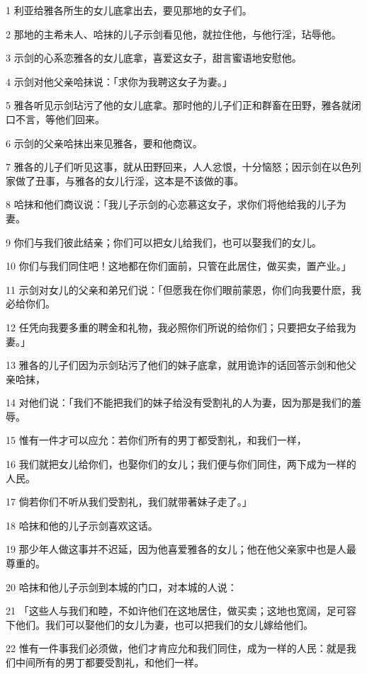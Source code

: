 \par 1 利亚给雅各所生的女儿底拿出去，要见那地的女子们。
\par 2 那地的主希未人、哈抹的儿子示剑看见他，就拉住他，与他行淫，玷辱他。
\par 3 示剑的心系恋雅各的女儿底拿，喜爱这女子，甜言蜜语地安慰他。
\par 4 示剑对他父亲哈抹说：「求你为我聘这女子为妻。」
\par 5 雅各听见示剑玷污了他的女儿底拿。那时他的儿子们正和群畜在田野，雅各就闭口不言，等他们回来。
\par 6 示剑的父亲哈抹出来见雅各，要和他商议。
\par 7 雅各的儿子们听见这事，就从田野回来，人人忿恨，十分恼怒；因示剑在以色列家做了丑事，与雅各的女儿行淫，这本是不该做的事。
\par 8 哈抹和他们商议说：「我儿子示剑的心恋慕这女子，求你们将他给我的儿子为妻。
\par 9 你们与我们彼此结亲；你们可以把女儿给我们，也可以娶我们的女儿。
\par 10 你们与我们同住吧！这地都在你们面前，只管在此居住，做买卖，置产业。」
\par 11 示剑对女儿的父亲和弟兄们说：「但愿我在你们眼前蒙恩，你们向我要什麽，我必给你们。
\par 12 任凭向我要多重的聘金和礼物，我必照你们所说的给你们；只要把女子给我为妻。」
\par 13 雅各的儿子们因为示剑玷污了他们的妹子底拿，就用诡诈的话回答示剑和他父亲哈抹，
\par 14 对他们说：「我们不能把我们的妹子给没有受割礼的人为妻，因为那是我们的羞辱。
\par 15 惟有一件才可以应允：若你们所有的男丁都受割礼，和我们一样，
\par 16 我们就把女儿给你们，也娶你们的女儿；我们便与你们同住，两下成为一样的人民。
\par 17 倘若你们不听从我们受割礼，我们就带著妹子走了。」
\par 18 哈抹和他的儿子示剑喜欢这话。
\par 19 那少年人做这事并不迟延，因为他喜爱雅各的女儿；他在他父亲家中也是人最尊重的。
\par 20 哈抹和他儿子示剑到本城的门口，对本城的人说：
\par 21 「这些人与我们和睦，不如许他们在这地居住，做买卖；这地也宽阔，足可容下他们。我们可以娶他们的女儿为妻，也可以把我们的女儿嫁给他们。
\par 22 惟有一件事我们必须做，他们才肯应允和我们同住，成为一样的人民：就是我们中间所有的男丁都要受割礼，和他们一样。

